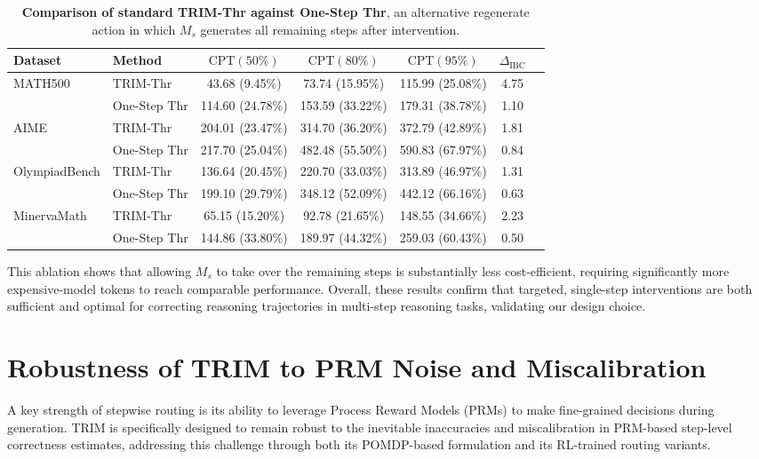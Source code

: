 \documentclass{article}
\theoremstyle{plain}
\theoremstyle{definition}
\theoremstyle{remark}
\begin{document}
\begin{table}[t]
\caption{\footnotesize{\textbf{Comparison of standard TRIM-Thr against One-Step Thr}, an alternative regenerate action in which $M_s$ generates all remaining steps after intervention.}}
\label{tab:One-Step-Thr}
\centering
\begin{tabular}{llccccc}
\toprule
Dataset & Method & $\mathrm{CPT}(50\%)$ & $\mathrm{CPT}(80\%)$ & $\mathrm{CPT}(95\%)$ & $\Delta_{\text{IBC}}$ \\
\midrule
\multirow{2}{*}{MATH500}
 & TRIM-Thr     & 43.68 (9.45\%)  & 73.74 (15.95\%) & 115.99 (25.08\%) & 4.75 \\
 & One-Step Thr & 114.60 (24.78\%) & 153.59 (33.22\%) & 179.31 (38.78\%) & 1.10 \\
\midrule
\multirow{2}{*}{AIME}
 & TRIM-Thr     & 204.01 (23.47\%) & 314.70 (36.20\%) & 372.79 (42.89\%) & 1.81 \\
 & One-Step Thr & 217.70 (25.04\%) & 482.48 (55.50\%) & 590.83 (67.97\%) & 0.84 \\
\midrule
\multirow{2}{*}{OlympiadBench}
 & TRIM-Thr     & 136.64 (20.45\%) & 220.70 (33.03\%) & 313.89 (46.97\%) & 1.31 \\
 & One-Step Thr & 199.10 (29.79\%) & 348.12 (52.09\%) & 442.12 (66.16\%) & 0.63 \\
\midrule
\multirow{2}{*}{MinervaMath}
 & TRIM-Thr     & 65.15 (15.20\%)  & 92.78 (21.65\%)  & 148.55 (34.66\%) & 2.23 \\
 & One-Step Thr & 144.86 (33.80\%) & 189.97 (44.32\%) & 259.03 (60.43\%) & 0.50 \\
\bottomrule
\end{tabular}
\end{table}

This ablation shows that allowing $M_s$ to take over the remaining steps is substantially less cost-efficient, requiring significantly more expensive-model tokens to reach comparable performance. Overall, these results confirm that targeted, single-step interventions are both sufficient and optimal for correcting reasoning trajectories in multi-step reasoning tasks, validating our design choice.

\section{Robustness of TRIM to PRM Noise and Miscalibration}
\label{sec:robust}
A key strength of stepwise routing is its ability to leverage Process Reward Models (PRMs) to make fine-grained decisions during generation. TRIM is specifically designed to remain robust to the inevitable inaccuracies and miscalibration in PRM-based step-level correctness estimates, addressing this challenge through both its POMDP-based formulation and its RL-trained routing variants.
\end{document}
